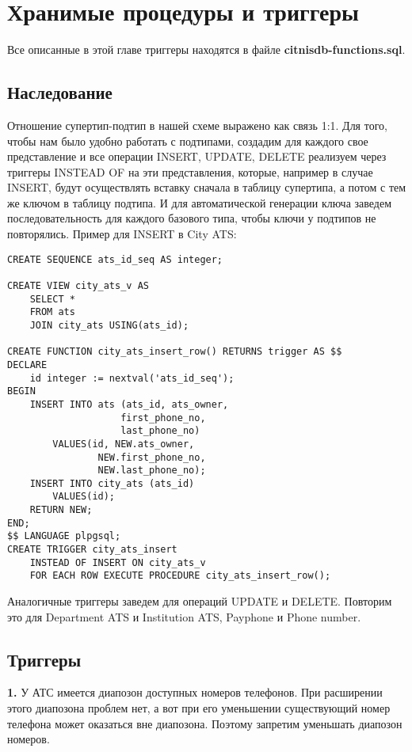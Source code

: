 \documentclass{report}
\begin{document}
\chapter{Хранимые процедуры и триггеры}

Все описанные в этой главе триггеры находятся в файле 
\textbf{citnisdb-functions.sql}.

\section{Наследование}

Отношение супертип-подтип в нашей схеме выражено как связь 1:1. 
Для того, чтобы нам было удобно работать с подтипами, создадим
для каждого свое представление и все операции INSERT, UPDATE, DELETE
реализуем через триггеры INSTEAD OF на эти представления, которые,
например в случае INSERT, будут осуществлять вставку сначала в 
таблицу супертипа, а потом с тем же ключом в таблицу подтипа.
И для автоматической генерации ключа заведем последовательность 
для каждого базового типа, чтобы ключи у подтипов не повторялись.
Пример для INSERT в City ATS:
\begin{lstlisting}
CREATE SEQUENCE ats_id_seq AS integer;

CREATE VIEW city_ats_v AS
    SELECT *
    FROM ats 
    JOIN city_ats USING(ats_id); 

CREATE FUNCTION city_ats_insert_row() RETURNS trigger AS $$
DECLARE
    id integer := nextval('ats_id_seq');
BEGIN
    INSERT INTO ats (ats_id, ats_owner, 
                    first_phone_no, 
                    last_phone_no)
        VALUES(id, NEW.ats_owner, 
                NEW.first_phone_no, 
                NEW.last_phone_no);
    INSERT INTO city_ats (ats_id)
        VALUES(id);
    RETURN NEW;
END;
$$ LANGUAGE plpgsql;
CREATE TRIGGER city_ats_insert 
    INSTEAD OF INSERT ON city_ats_v
    FOR EACH ROW EXECUTE PROCEDURE city_ats_insert_row();
\end{lstlisting}

Аналогичные триггеры заведем для операций UPDATE и DELETE. 
Повторим это для Department ATS и Institution ATS, 
Payphone и Phone number.

\section{Триггеры}

\textbf{1.} У АТС имеется диапозон доступных номеров телефонов. 
При расширении этого диапозона проблем нет, а вот при его 
уменьшении существующий номер телефона может оказаться 
вне диапозона. Поэтому запретим уменьшать диапозон номеров.
\end{document}
